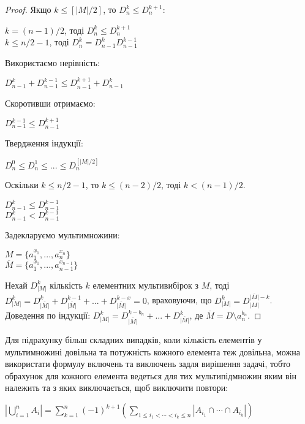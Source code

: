 \begin{proof}
Якщо $k \leq [|M|/2]$, то $D_n^k \leq D_n^{k+1}$:
\begin{center}
$k = (n-1)/2$, тоді $D_n^k \leq D_n^{k+1}$
\\
$k \leq n/2 - 1$, тоді $D_n^k = D_{n-1}^k D_{n-1}^{k-1}$
\end{center}
Використаємо нерівність:
\begin{center}
$D_{n-1}^k + D_{n-1}^{k-1} \leq D_{n-1}^{k+1} + D_{n-1}^{k}$
\end{center}
Скоротивши отримаємо:
\begin{center}
$D_{n-1}^{k-1} \leq D_{n-1}^{k+1}$
\end{center}

Твердження індукції:
\begin{center}
$ D_n^0 \leq D_n^1 \leq ... \leq D_n^{[|M|/2]}$
\end{center}

Оскільки $k \leq n/2 - 1$, то $k \leq (n - 2)/2$, тоді $k < (n - 1)/2$.
\begin{center}
$D_{n-1}^{k} \leq D_{n-1}^{k-1}$
\\
$D_{n-1}^{k} < D_{n-1}^{k-1}$
\end{center}

Задекларуємо мультимножини:

\begin{center}
$M = \{a_1^{x_1}, ... , a_n^{x_n}\} $ 
\\
$\overline{M} = \{a_1^{x_1}, ... , a_{n-1}^{x_{n-1}}\} $ 
\end{center}

Нехай $D_{|M|}^k $ кількість $k$ елементних мультивибірок з $M$, тоді  $D_{|M|}^k =  D_{\overline{|M|}}^k + D_{\overline{|M|}}
^{k-1} + ... + D_{\overline{|M|}}^{k-x} = 0  $, враховуючи, що $D_{|M|}^k  = D_{|M|}^{\overline{|M|} - k}$. 
\\
Доведення по індукції: $D_{|M|}^k  = D_{\overline{|M|}}^{k-b_n} + ... + D_{\overline{|M|}}^k$, де $\overline{M} = D \setminus {a_n^{b_n}}$.

\end{proof}

Для підрахунку більш складних випадків, коли кількість елементів у мультимножині довільна та потужність кожного елемента теж довільна, можна використати формулу включень та виключень задля вирішення задачі, тобто обрахунок для кожного елемента ведеться для тих мультипідмножин яким він належить та з яких виключається, щоб виключити повтори:
\begin{center}
${\displaystyle \left|\bigcup _{i=1}^{n}A_{i}\right|=\sum _{k=1}^{n}(-1)^{k+1}\left(\sum _{1\leqslant i_{1}<\cdots <i_{k}\leqslant n}|A_{i_{1}}\cap \cdots \cap A_{i_{k}}|\right)}$
\end{center}



